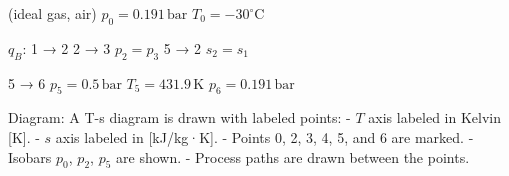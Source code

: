 (ideal gas, air)  
\( p_0 = 0.191 \, \text{bar} \)  
\( T_0 = -30^\circ \text{C} \)  

\( q_B \):  
1 → 2  
2 → 3  
\( p_2 = p_3 \)  
5 → 2  
\( s_2 = s_1 \)  

5 → 6  
\( p_5 = 0.5 \, \text{bar} \)  
\( T_5 = 431.9 \, \text{K} \)  
\( p_6 = 0.191 \, \text{bar} \)  

Diagram:  
A T-s diagram is drawn with labeled points:  
- \( T \) axis labeled in Kelvin [K].  
- \( s \) axis labeled in [kJ/kg·K].  
- Points 0, 2, 3, 4, 5, and 6 are marked.  
- Isobars \( p_0 \), \( p_2 \), \( p_5 \) are shown.  
- Process paths are drawn between the points.